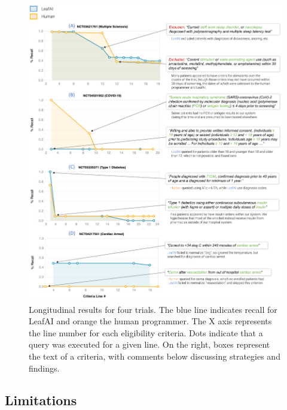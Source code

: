 \documentclass[../main.tex]{subfiles}
\begin{document}
\begin{figure}[H]
  \begin{center}
    \includegraphics[scale=0.54]{Figures/7_query_generation/leafai_analysis.pdf} 
  \end{center}
  \caption{Longitudinal results for four trials. The blue line indicates recall for LeafAI and orange the human programmer. The X axis represents the line number for each eligibility criteria. Dots indicate that a query was executed for a given line. On the right, boxes represent the text of a criteria, with comments below discussing strategies and findings.}
  \label{fig_leafai_results_analysis}
\end{figure}

\subsection*{Limitations}
\end{document}
